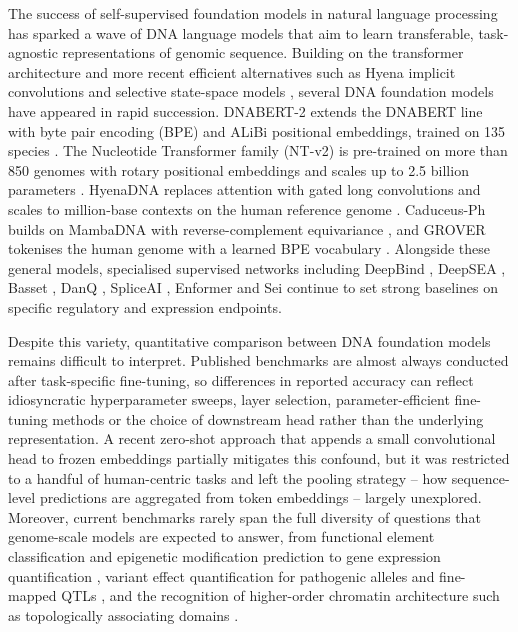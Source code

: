 \documentclass[11pt,a4paper]{article}
\begin{document}
The success of self-supervised foundation models in natural language processing has sparked a wave of DNA language models that aim to learn transferable, task-agnostic representations of genomic sequence. Building on the transformer architecture \citep{vaswani2017attention,devlin2019bert} and more recent efficient alternatives such as Hyena implicit convolutions \citep{poli2023hyena} and selective state-space models \citep{gu2023mamba}, several DNA foundation models have appeared in rapid succession. DNABERT-2 extends the DNABERT line with byte pair encoding (BPE) and ALiBi positional embeddings, trained on 135 species \citep{zhou2024dnabert2}. The Nucleotide Transformer family (NT-v2) is pre-trained on more than 850 genomes with rotary positional embeddings and scales up to 2.5 billion parameters \citep{dallatorre2025nt}. HyenaDNA replaces attention with gated long convolutions and scales to million-base contexts on the human reference genome \citep{nguyen2023hyenadna}. Caduceus-Ph builds on MambaDNA with reverse-complement equivariance \citep{schiff2024caduceus}, and GROVER tokenises the human genome with a learned BPE vocabulary \citep{sanabria2024grover}. Alongside these general models, specialised supervised networks including DeepBind \citep{alipanahi2015deepbind}, DeepSEA \citep{zhou2015deepsea}, Basset \citep{kelley2016basset}, DanQ \citep{quang2016danq}, SpliceAI \citep{jaganathan2019spliceai}, Enformer \citep{avsec2021enformer} and Sei \citep{chen2022sei} continue to set strong baselines on specific regulatory and expression endpoints.

Despite this variety, quantitative comparison between DNA foundation models remains difficult to interpret. Published benchmarks are almost always conducted after task-specific fine-tuning, so differences in reported accuracy can reflect idiosyncratic hyperparameter sweeps, layer selection, parameter-efficient fine-tuning methods \citep{yuan2026borzoi_peft} or the choice of downstream head rather than the underlying representation. A recent zero-shot approach that appends a small convolutional head to frozen embeddings partially mitigates this confound, but it was restricted to a handful of human-centric tasks and left the pooling strategy -- how sequence-level predictions are aggregated from token embeddings -- largely unexplored. Moreover, current benchmarks rarely span the full diversity of questions that genome-scale models are expected to answer, from functional element classification and epigenetic modification prediction to gene expression quantification \citep{avsec2021enformer,karollus2023enformer_limits}, variant effect quantification for pathogenic alleles \citep{landrum2018clinvar,jaganathan2019spliceai} and fine-mapped QTLs \citep{gtex2020}, and the recognition of higher-order chromatin architecture such as topologically associating domains \citep{dixon2012topological,lieberman2009hic}.
\end{document}
